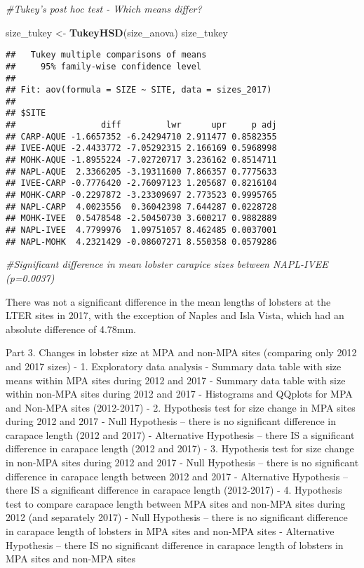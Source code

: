 \documentclass[]{article}
\newenvironment{Shaded}{\begin{snugshade}}{\end{snugshade}}
\newcommand{\KeywordTok}[1]{\textcolor[rgb]{0.13,0.29,0.53}{\textbf{#1}}}
\newcommand{\StringTok}[1]{\textcolor[rgb]{0.31,0.60,0.02}{#1}}
\newcommand{\CommentTok}[1]{\textcolor[rgb]{0.56,0.35,0.01}{\textit{#1}}}
\newcommand{\NormalTok}[1]{#1}
\begin{document}
\begin{Shaded}
\begin{Highlighting}[]
\CommentTok{#Tukey's post hoc test - Which means differ?}

\NormalTok{size_tukey <-}\StringTok{ }\KeywordTok{TukeyHSD}\NormalTok{(size_anova)}
\NormalTok{size_tukey}
\end{Highlighting}
\end{Shaded}

\begin{verbatim}
##   Tukey multiple comparisons of means
##     95% family-wise confidence level
## 
## Fit: aov(formula = SIZE ~ SITE, data = sizes_2017)
## 
## $SITE
##                 diff         lwr      upr     p adj
## CARP-AQUE -1.6657352 -6.24294710 2.911477 0.8582355
## IVEE-AQUE -2.4433772 -7.05292315 2.166169 0.5968998
## MOHK-AQUE -1.8955224 -7.02720717 3.236162 0.8514711
## NAPL-AQUE  2.3366205 -3.19311600 7.866357 0.7775633
## IVEE-CARP -0.7776420 -2.76097123 1.205687 0.8216104
## MOHK-CARP -0.2297872 -3.23309697 2.773523 0.9995765
## NAPL-CARP  4.0023556  0.36042398 7.644287 0.0228728
## MOHK-IVEE  0.5478548 -2.50450730 3.600217 0.9882889
## NAPL-IVEE  4.7799976  1.09751057 8.462485 0.0037001
## NAPL-MOHK  4.2321429 -0.08607271 8.550358 0.0579286
\end{verbatim}

\begin{Shaded}
\begin{Highlighting}[]
\CommentTok{#Significant difference in mean lobster carapice sizes between NAPL-IVEE (p=0.0037)}
\end{Highlighting}
\end{Shaded}

There was not a significant difference in the mean lengths of lobsters
at the LTER sites in 2017, with the exception of Naples and Isla Vista,
which had an absolute difference of 4.78mm.

Part 3. Changes in lobster size at MPA and non-MPA sites (comparing only
2012 and 2017 sizes) - 1. Exploratory data analysis - Summary data table
with size means within MPA sites during 2012 and 2017 - Summary data
table with size within non-MPA sites during 2012 and 2017 - Histograms
and QQplots for MPA and Non-MPA sites (2012-2017) - 2. Hypothesis test
for size change in MPA sites during 2012 and 2017 - Null Hypothesis --
there is no significant difference in carapace length (2012 and 2017) -
Alternative Hypothesis -- there IS a significant difference in carapace
length (2012 and 2017) - 3. Hypothesis test for size change in non-MPA
sites during 2012 and 2017 - Null Hypothesis -- there is no significant
difference in carapace length between 2012 and 2017 - Alternative
Hypothesis -- there IS a significant difference in carapace length
(2012-2017) - 4. Hypothesis test to compare carapace length between MPA
sites and non-MPA sites during 2012 (and separately 2017) - Null
Hypothesis -- there is no significant difference in carapace length of
lobsters in MPA sites and non-MPA sites - Alternative Hypothesis --
there IS no significant difference in carapace length of lobsters in MPA
sites and non-MPA sites
\end{document}
